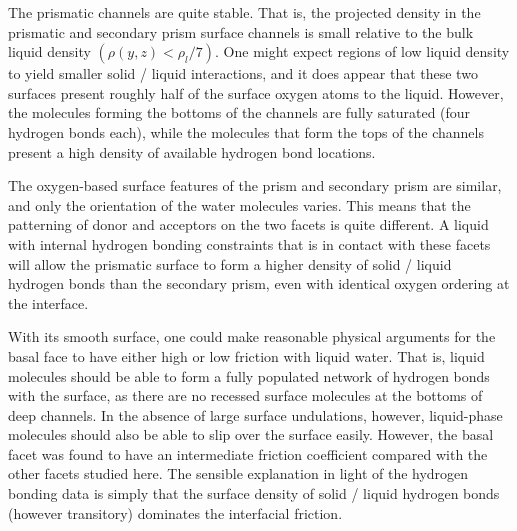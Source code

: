 The prismatic channels are quite stable. That is, the projected
density in the prismatic and secondary prism surface channels is small
relative to the bulk liquid density $(\rho(y,z) < \rho_l / 7)$.  One
might expect regions of low liquid density to yield smaller solid /
liquid interactions, and it does appear that these two surfaces
present roughly half of the surface oxygen atoms to the liquid.
However, the molecules forming the bottoms of the channels are fully
saturated (four hydrogen bonds each), while the molecules that form
the tops of the channels present a high density of available hydrogen
bond locations.

The oxygen-based surface features of the prism and secondary prism are
similar, and only the orientation of the water molecules varies.  This
means that the patterning of donor and acceptors on the two facets is
quite different. A liquid with internal hydrogen bonding constraints
that is in contact with these facets will allow the prismatic surface
to form a higher density of solid / liquid hydrogen bonds than the
secondary prism, even with identical oxygen ordering at the interface.


With its smooth surface, one could make reasonable physical arguments
for the basal face to have either high or low friction with liquid
water. That is, liquid molecules should be able to form a fully
populated network of hydrogen bonds with the surface, as there are no
recessed surface molecules at the bottoms of deep channels. In the
absence of large surface undulations, however, liquid-phase molecules
should also be able to slip over the surface easily. However, the
basal facet was found to have an intermediate friction coefficient
compared with the other facets studied here. The sensible explanation
in light of the hydrogen bonding data is simply that the surface
density of solid / liquid hydrogen bonds (however transitory)
dominates the interfacial friction.

